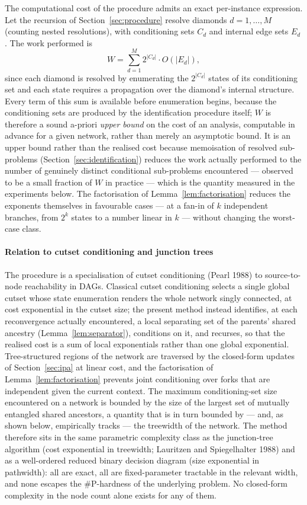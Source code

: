 \documentclass[preprint,12pt]{elsarticle}
\theoremstyle{definition}
\begin{document}
The computational cost of the procedure admits an exact per-instance expression. Let the recursion of
Section~\ref{sec:procedure} resolve diamonds $d=1,\dots,M$ (counting nested resolutions), with
conditioning sets $C_d$ and internal edge sets $E_d$. The work performed is
\begin{equation}\label{eq:work}
W=\sum_{d=1}^{M} 2^{|C_d|}\cdot O(|E_d|),
\end{equation}
since each diamond is resolved by enumerating the $2^{|C_d|}$ states of its conditioning set and each
state requires a propagation over the diamond's internal structure. Every term of this sum is available
before enumeration begins, because the conditioning sets are produced by the identification procedure
itself; $W$ is therefore a sound a-priori \emph{upper bound} on the cost of an analysis, computable in
advance for a given network, rather than merely an asymptotic bound. It is an upper bound rather than the
realised cost because memoisation of resolved sub-problems (Section~\ref{sec:identification}) reduces
the work actually performed to the number of genuinely distinct conditional sub-problems encountered ---
observed to be a small fraction of $W$ in practice --- which is the quantity measured in the experiments
below. The factorisation of Lemma~\ref{lem:factorisation} reduces
the exponents themselves in favourable cases --- at a fan-in of $k$ independent branches, from $2^k$
states to a number linear in $k$ --- without changing the worst-case class.

\paragraph{Relation to cutset conditioning and junction trees}
The procedure is a specialisation of cutset conditioning (Pearl 1988) to source-to-node reachability in
DAGs. Classical cutset conditioning selects a single global cutset whose state enumeration renders the
whole network singly connected, at cost exponential in the cutset size; the present method instead
identifies, at each reconvergence actually encountered, a local separating set of the parents' shared
ancestry (Lemma~\ref{lem:separator}), conditions on it, and recurses, so that the realised cost is a sum
of local exponentials rather than one global exponential. Tree-structured regions of the network are
traversed by the closed-form updates of Section~\ref{sec:ipa} at linear cost, and the factorisation of
Lemma~\ref{lem:factorisation} prevents joint conditioning over forks that are independent given the
current context. The maximum conditioning-set size encountered on a network is bounded by the size of
the largest set of mutually entangled shared ancestors, a quantity that is in turn bounded by --- and,
as shown below, empirically tracks --- the treewidth of the network. The method therefore sits in the
same parametric complexity class as the junction-tree algorithm (cost exponential in treewidth;
Lauritzen and Spiegelhalter 1988) and as a well-ordered reduced binary decision diagram (size
exponential in pathwidth): all are exact, all are fixed-parameter tractable in the relevant width, and
none escapes the \#P-hardness of the underlying problem. No closed-form complexity in the node count
alone exists for any of them.
\end{document}
